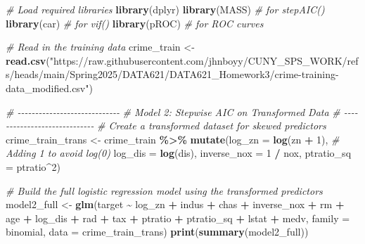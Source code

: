 \documentclass[
]{article}
\newenvironment{Shaded}{\begin{snugshade}}{\end{snugshade}}
\newcommand{\AttributeTok}[1]{\textcolor[rgb]{0.13,0.29,0.53}{#1}}
\newcommand{\CommentTok}[1]{\textcolor[rgb]{0.56,0.35,0.01}{\textit{#1}}}
\newcommand{\DecValTok}[1]{\textcolor[rgb]{0.00,0.00,0.81}{#1}}
\newcommand{\FunctionTok}[1]{\textcolor[rgb]{0.13,0.29,0.53}{\textbf{#1}}}
\newcommand{\NormalTok}[1]{#1}
\newcommand{\OtherTok}[1]{\textcolor[rgb]{0.56,0.35,0.01}{#1}}
\newcommand{\SpecialCharTok}[1]{\textcolor[rgb]{0.81,0.36,0.00}{\textbf{#1}}}
\newcommand{\StringTok}[1]{\textcolor[rgb]{0.31,0.60,0.02}{#1}}
\begin{document}
\begin{Shaded}
\begin{Highlighting}[]
\CommentTok{\# Load required libraries}
\FunctionTok{library}\NormalTok{(dplyr)}
\FunctionTok{library}\NormalTok{(MASS)      }\CommentTok{\# for stepAIC()}
\FunctionTok{library}\NormalTok{(car)       }\CommentTok{\# for vif()}
\FunctionTok{library}\NormalTok{(pROC)      }\CommentTok{\# for ROC curves}

\CommentTok{\# Read in the training data}
\NormalTok{crime\_train }\OtherTok{\textless{}{-}} \FunctionTok{read.csv}\NormalTok{(}\StringTok{"https://raw.githubusercontent.com/jhnboyy/CUNY\_SPS\_WORK/refs/heads/main/Spring2025/DATA621/DATA621\_Homework3/crime{-}training{-}data\_modified.csv"}\NormalTok{)}

\CommentTok{\# {-}{-}{-}{-}{-}{-}{-}{-}{-}{-}{-}{-}{-}{-}{-}{-}{-}{-}{-}{-}{-}{-}{-}{-}{-}{-}{-}{-}{-}}
\CommentTok{\# Model 2: Stepwise AIC on Transformed Data}
\CommentTok{\# {-}{-}{-}{-}{-}{-}{-}{-}{-}{-}{-}{-}{-}{-}{-}{-}{-}{-}{-}{-}{-}{-}{-}{-}{-}{-}{-}{-}{-}}
\CommentTok{\# Create a transformed dataset for skewed predictors}
\NormalTok{crime\_train\_trans }\OtherTok{\textless{}{-}}\NormalTok{ crime\_train }\SpecialCharTok{\%\textgreater{}\%}
  \FunctionTok{mutate}\NormalTok{(}\AttributeTok{log\_zn      =} \FunctionTok{log}\NormalTok{(zn }\SpecialCharTok{+} \DecValTok{1}\NormalTok{),    }\CommentTok{\# Adding 1 to avoid log(0)}
         \AttributeTok{log\_dis     =} \FunctionTok{log}\NormalTok{(dis),}
         \AttributeTok{inverse\_nox =} \DecValTok{1} \SpecialCharTok{/}\NormalTok{ nox,}
         \AttributeTok{ptratio\_sq  =}\NormalTok{ ptratio}\SpecialCharTok{\^{}}\DecValTok{2}\NormalTok{)}

\CommentTok{\# Build the full logistic regression model using the transformed predictors}
\NormalTok{model2\_full }\OtherTok{\textless{}{-}} \FunctionTok{glm}\NormalTok{(target }\SpecialCharTok{\textasciitilde{}}\NormalTok{ log\_zn }\SpecialCharTok{+}\NormalTok{ indus }\SpecialCharTok{+}\NormalTok{ chas }\SpecialCharTok{+}\NormalTok{ inverse\_nox }\SpecialCharTok{+}\NormalTok{ rm }\SpecialCharTok{+}
\NormalTok{                     age }\SpecialCharTok{+}\NormalTok{ log\_dis }\SpecialCharTok{+}\NormalTok{ rad }\SpecialCharTok{+}\NormalTok{ tax }\SpecialCharTok{+}\NormalTok{ ptratio }\SpecialCharTok{+}\NormalTok{ ptratio\_sq }\SpecialCharTok{+}
\NormalTok{                     lstat }\SpecialCharTok{+}\NormalTok{ medv,}
                   \AttributeTok{family =}\NormalTok{ binomial, }\AttributeTok{data =}\NormalTok{ crime\_train\_trans)}
\FunctionTok{print}\NormalTok{(}\FunctionTok{summary}\NormalTok{(model2\_full))}
\end{Highlighting}
\end{Shaded}
\end{document}
